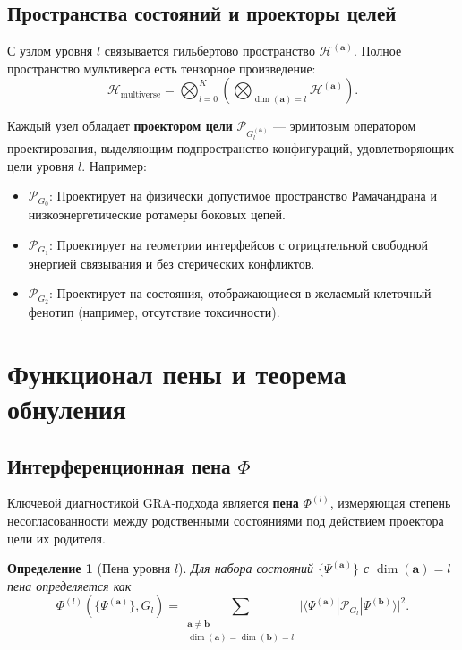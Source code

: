 \documentclass[11pt]{article}
\newtheorem{definition}[theorem]{Определение}
\newcommand{\cP}{\mathcal{P}}
\newcommand{\cH}{\mathcal{H}}
\begin{document}
\subsection{Пространства состояний и проекторы целей}

С узлом уровня \(l\) связывается гильбертово пространство \(\cH^{(\mathbf{a})}\). Полное пространство мультиверса есть тензорное произведение:
\begin{equation}
\cH_{\text{multiverse}} = \bigotimes_{l=0}^{K} \left( \bigotimes_{\dim(\mathbf{a})=l} \cH^{(\mathbf{a})} \right).
\end{equation}

Каждый узел обладает \textbf{проектором цели} \(\cP_{G_l^{(\mathbf{a})}}\) — эрмитовым оператором проектирования, выделяющим подпространство конфигураций, удовлетворяющих цели уровня \(l\). Например:
\begin{itemize}
    \item \(\cP_{G_0}\): Проектирует на физически допустимое пространство Рамачандрана и низкоэнергетические ротамеры боковых цепей.
    \item \(\cP_{G_1}\): Проектирует на геометрии интерфейсов с отрицательной свободной энергией связывания и без стерических конфликтов.
    \item \(\cP_{G_2}\): Проектирует на состояния, отображающиеся в желаемый клеточный фенотип (например, отсутствие токсичности).
\end{itemize}

\section{Функционал пены и теорема обнуления}

\subsection{Интерференционная пена \(\Phi\)}

Ключевой диагностикой GRA-подхода является \textbf{пена} \(\Phi^{(l)}\), измеряющая степень несогласованности между родственными состояниями под действием проектора цели их родителя.

\begin{definition}[Пена уровня \(l\)]
Для набора состояний \(\{\Psi^{(\mathbf{a})}\}\) с \(\dim(\mathbf{a})=l\) пена определяется как
\begin{equation}
\Phi^{(l)}(\{\Psi^{(\mathbf{a})}\}, G_l) = \sum_{\substack{\mathbf{a} \neq \mathbf{b} \\ \dim(\mathbf{a})=\dim(\mathbf{b})=l}} \big| \langle \Psi^{(\mathbf{a})} | \cP_{G_l} | \Psi^{(\mathbf{b})} \rangle \big|^2.
\end{equation}
\end{definition}
\end{document}
